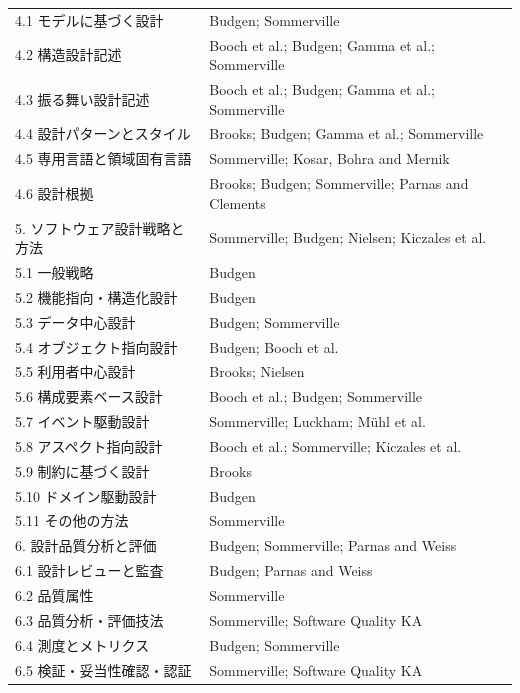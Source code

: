 \begin{longtable}{L{66mm}L{98mm}}
4.1 モデルに基づく設計 & Budgen; Sommerville \\
4.2 構造設計記述 & Booch et al.; Budgen; Gamma et al.; Sommerville \\
4.3 振る舞い設計記述 & Booch et al.; Budgen; Gamma et al.; Sommerville \\
4.4 設計パターンとスタイル & Brooks; Budgen; Gamma et al.; Sommerville \\
4.5 専用言語と領域固有言語 & Sommerville; Kosar, Bohra and Mernik \\
4.6 設計根拠 & Brooks; Budgen; Sommerville; Parnas and Clements \\
5. ソフトウェア設計戦略と方法 & Sommerville; Budgen; Nielsen; Kiczales et al. \\
5.1 一般戦略 & Budgen \\
5.2 機能指向・構造化設計 & Budgen \\
5.3 データ中心設計 & Budgen; Sommerville \\
5.4 オブジェクト指向設計 & Budgen; Booch et al. \\
5.5 利用者中心設計 & Brooks; Nielsen \\
5.6 構成要素ベース設計 & Booch et al.; Budgen; Sommerville \\
5.7 イベント駆動設計 & Sommerville; Luckham; Mühl et al. \\
5.8 アスペクト指向設計 & Booch et al.; Sommerville; Kiczales et al. \\
5.9 制約に基づく設計 & Brooks \\
5.10 ドメイン駆動設計 & Budgen \\
5.11 その他の方法 & Sommerville \\
6. 設計品質分析と評価 & Budgen; Sommerville; Parnas and Weiss \\
6.1 設計レビューと監査 & Budgen; Parnas and Weiss \\
6.2 品質属性 & Sommerville \\
6.3 品質分析・評価技法 & Sommerville; Software Quality KA \\
6.4 測度とメトリクス & Budgen; Sommerville \\
6.5 検証・妥当性確認・認証 & Sommerville; Software Quality KA \\
\bottomrule
\end{longtable}
